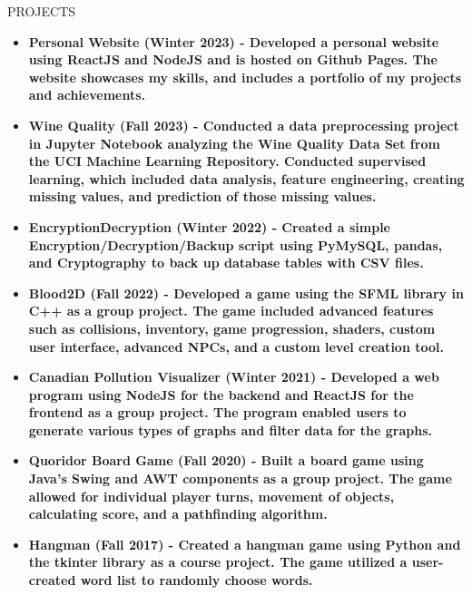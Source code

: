 \documentclass{resume}
\begin{document}
\begin{rSection}{PROJECTS}
\\
\begin{itemize}
    \itemsep -3pt {} 
     \item \bf Personal Website (Winter 2023) - \normalfont Developed a personal website using ReactJS and NodeJS and is hosted on Github Pages. The website showcases my skills, and includes a portfolio of my projects and achievements.
     \item \bf Wine Quality (Fall 2023) - \normalfont Conducted a data preprocessing project in Jupyter Notebook analyzing the Wine Quality Data Set from the UCI Machine Learning Repository. Conducted supervised learning, which included data analysis, feature engineering, creating missing values, and prediction of those missing values.
     \item \bf EncryptionDecryption (Winter 2022) - \normalfont Created a simple Encryption/Decryption/Backup script using PyMySQL, pandas, and Cryptography to back up database tables with CSV files.
     \item \bf Blood2D (Fall 2022) - \normalfont Developed a game using the SFML library in C++ as a group project. The game included advanced features such as collisions, inventory, game progression, shaders, custom user interface, advanced NPCs, and a custom level creation tool.
     \item \bf Canadian Pollution Visualizer (Winter 2021) - \normalfont Developed a web program using NodeJS for the backend and ReactJS for the frontend as a group project. The program enabled users to generate various types of graphs and filter data for the graphs.
     \item \bf Quoridor Board Game (Fall 2020) - \normalfont Built a board game using Java's Swing and AWT components as a group project. The game allowed for individual player turns, movement of objects, calculating score, and a pathfinding algorithm.
     \item  \bf Hangman (Fall 2017) - \normalfont Created a hangman game using Python and the tkinter library as a course project. The game utilized a user-created word list to randomly choose words.   
\end{itemize}
\end{rSection} 
\end{document}
